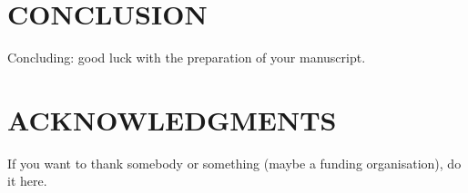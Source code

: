 \documentclass[12pt]{article}
\begin{document}
%
\section{CONCLUSION} 
\label{sect::conclusion}

Concluding: good luck with the preparation of your manuscript.

%
\section*{ACKNOWLEDGMENTS}

If you want to thank somebody or something (maybe a funding organisation), do it here.
\end{document}
